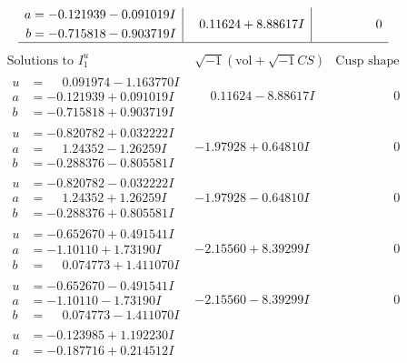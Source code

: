 \documentclass[1p]{elsarticle_modified}
\theoremstyle{definition}
\newcommand{\I}{\sqrt{-1}}
\begin{document}
$$\begin{array}{c|c|c}
\begin{aligned}
a &= -0.121939 - 0.091019 I \\
b &= -0.715818 - 0.903719 I\end{aligned}
 & \phantom{-}0.11624 + 8.88617 I & \phantom{-0.000000 } 0\\
 \hline 
 \end{array}$$\newpage$$\begin{array}{c|c|c}  
\text{Solutions to }I^u_{1}& \I (\text{vol} + \sqrt{-1}CS) & \text{Cusp shape}\\
 \hline 
\begin{aligned}
u &= \phantom{-}0.091974 - 1.163770 I \\
a &= -0.121939 + 0.091019 I \\
b &= -0.715818 + 0.903719 I\end{aligned}
 & \phantom{-}0.11624 - 8.88617 I & \phantom{-0.000000 } 0 \\ \hline\begin{aligned}
u &= -0.820782 + 0.032222 I \\
a &= \phantom{-}1.24352 - 1.26259 I \\
b &= -0.288376 - 0.805581 I\end{aligned}
 & -1.97928 + 0.64810 I & \phantom{-0.000000 } 0 \\ \hline\begin{aligned}
u &= -0.820782 - 0.032222 I \\
a &= \phantom{-}1.24352 + 1.26259 I \\
b &= -0.288376 + 0.805581 I\end{aligned}
 & -1.97928 - 0.64810 I & \phantom{-0.000000 } 0 \\ \hline\begin{aligned}
u &= -0.652670 + 0.491541 I \\
a &= -1.10110 + 1.73190 I \\
b &= \phantom{-}0.074773 + 1.411070 I\end{aligned}
 & -2.15560 + 8.39299 I & \phantom{-0.000000 } 0 \\ \hline\begin{aligned}
u &= -0.652670 - 0.491541 I \\
a &= -1.10110 - 1.73190 I \\
b &= \phantom{-}0.074773 - 1.411070 I\end{aligned}
 & -2.15560 - 8.39299 I & \phantom{-0.000000 } 0 \\ \hline\begin{aligned}
u &= -0.123985 + 1.192230 I \\
a &= -0.187716 + 0.214512 I \\

\end{aligned}
\end{array}$$
\end{document}
